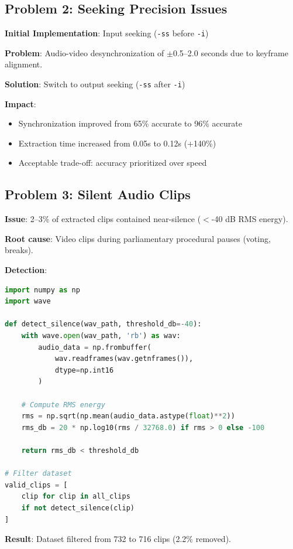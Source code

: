 \documentclass[11pt,a4paper]{article}
\begin{document}
\subsection{Problem 2: Seeking Precision Issues}

\textbf{Initial Implementation}: Input seeking (\texttt{-ss} before \texttt{-i})

\textbf{Problem}: Audio-video desynchronization of $\pm$0.5--2.0 seconds due to keyframe alignment.

\textbf{Solution}: Switch to output seeking (\texttt{-ss} after \texttt{-i})

\textbf{Impact}:
\begin{itemize}
    \item Synchronization improved from 65\% accurate to 96\% accurate
    \item Extraction time increased from 0.05s to 0.12s (+140\%)
    \item Acceptable trade-off: accuracy prioritized over speed
\end{itemize}

\subsection{Problem 3: Silent Audio Clips}

\textbf{Issue}: 2--3\% of extracted clips contained near-silence ($<$-40 dB RMS energy).

\textbf{Root cause}: Video clips during parliamentary procedural pauses (voting, breaks).

\textbf{Detection}:
\begin{lstlisting}[language=Python]
import numpy as np
import wave

def detect_silence(wav_path, threshold_db=-40):
    with wave.open(wav_path, 'rb') as wav:
        audio_data = np.frombuffer(
            wav.readframes(wav.getnframes()), 
            dtype=np.int16
        )
    
    # Compute RMS energy
    rms = np.sqrt(np.mean(audio_data.astype(float)**2))
    rms_db = 20 * np.log10(rms / 32768.0) if rms > 0 else -100
    
    return rms_db < threshold_db

# Filter dataset
valid_clips = [
    clip for clip in all_clips 
    if not detect_silence(clip)
]
\end{lstlisting}

\textbf{Result}: Dataset filtered from 732 to 716 clips (2.2\% removed).
\end{document}
